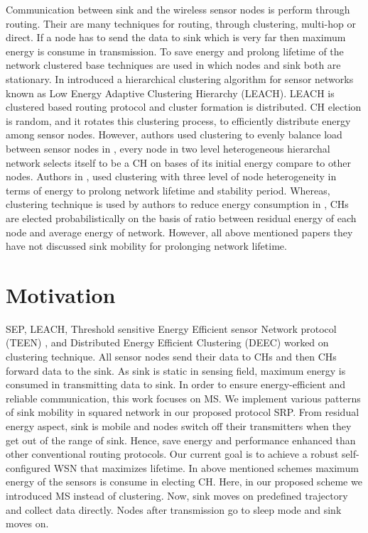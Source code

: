 \documentclass{article}
\begin{document}
Communication between sink and the wireless sensor nodes is perform through routing. Their are many techniques for routing, through clustering, multi-hop or direct. If a node has to send the data to sink which is very far then maximum energy is consume in transmission. To save energy and prolong lifetime of the network clustered base techniques are used in which nodes and sink both are stationary. In \cite{12} introduced a hierarchical clustering algorithm for sensor networks known as Low Energy Adaptive Clustering Hierarchy (LEACH). LEACH is clustered based routing protocol and cluster formation is distributed. CH election is random, and it rotates this clustering process, to efficiently distribute energy among sensor nodes. However, authors used clustering to evenly balance load between sensor nodes in \cite{2}, every node in two level heterogeneous hierarchal network selects itself to be a CH on bases of its initial energy compare to other nodes. Authors in \cite{13}, used clustering with three level of node heterogeneity in terms of energy to prolong network lifetime and stability period. Whereas, clustering technique is used by authors to reduce energy consumption in \cite{14}, CHs are elected probabilistically on the basis of ratio between residual energy of each node and average energy of network. However, all above mentioned papers they have not discussed sink mobility for prolonging network lifetime.

\section{Motivation}
SEP, LEACH, Threshold sensitive Energy Efficient sensor Network protocol (TEEN) \cite{15}, and Distributed Energy Efficient Clustering (DEEC) \cite{14} worked on clustering technique. All sensor nodes send their data to CHs and then CHs forward data to the sink. As sink is static in sensing field, maximum energy is consumed in transmitting data to sink. In order to ensure energy-efficient and reliable communication, this work focuses on MS. We implement various patterns of sink mobility in squared network in our proposed protocol SRP. From residual energy aspect, sink is mobile and nodes switch off their transmitters when they get out of the range of sink. Hence, save energy and performance enhanced than other conventional routing protocols. Our current goal is to achieve a robust self-configured WSN that maximizes lifetime. In above mentioned schemes maximum energy of the sensors is consume in electing CH. Here, in our proposed scheme we introduced MS instead of clustering. Now, sink moves on predefined trajectory and collect data directly. Nodes after transmission go to sleep mode and sink moves on.
\end{document}

